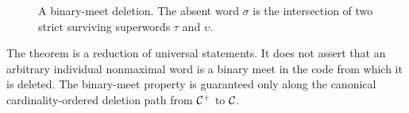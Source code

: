 \begin{figure}[t]
\centering

\caption{A binary-meet deletion.  The absent word $\sigma$ is the intersection of two strict surviving superwords $\tau$ and $\upsilon$.}
\label{fig:binary-meet}
\end{figure}

\begin{remark}
The theorem is a reduction of universal statements.  It does not assert that an arbitrary individual nonmaximal word is a binary meet in the code from which it is deleted.  The binary-meet property is guaranteed only along the canonical cardinality-ordered deletion path from $\mathcal C^+$ to $\mathcal C$.
\end{remark}
